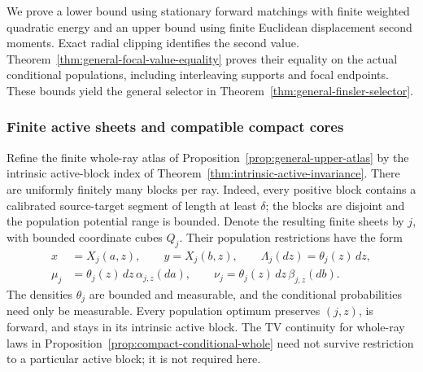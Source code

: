 \documentclass[11pt,reqno]{amsart}
\theoremstyle{definition}
\theoremstyle{remark}
\numberwithin{equation}{section}
\begin{document}
We prove a lower bound using stationary forward matchings with finite
weighted quadratic energy and an upper bound using finite Euclidean
displacement second moments. Exact radial clipping identifies the
second value. Theorem~\ref{thm:general-focal-value-equality} proves
their equality on the actual conditional populations, including
interleaving supports and focal endpoints. These bounds yield the
general selector in Theorem~\ref{thm:general-finsler-selector}.

\subsubsection{Finite active sheets and compatible compact cores}

Refine the finite whole-ray atlas of
Proposition~\ref{prop:general-upper-atlas} by the intrinsic active-block
index of Theorem~\ref{thm:intrinsic-active-invariance}. There are uniformly
finitely many blocks per ray. Indeed, every positive block contains a
calibrated source-target segment of length at least \(\delta\); the blocks
are disjoint and the population potential range is bounded. Denote the
resulting finite sheets by \(j\), with bounded coordinate cubes \(Q_j\).
Their population restrictions have the form
\begin{equation}
\label{general-gluing-sheet-disintegration}
 \begin{split}
 x&=X_j(a,z),\qquad y=X_j(b,z),\qquad
 \Lambda_j(dz)=\theta_j(z)\,dz,\\
 \mu_j&=\theta_j(z)\,dz\,\alpha_{j,z}(da),\qquad
 \nu_j=\theta_j(z)\,dz\,\beta_{j,z}(db).
 \end{split}
\end{equation}
The densities \(\theta_j\) are bounded and measurable, and the conditional
probabilities need only be measurable. Every population optimum preserves
\((j,z)\), is forward, and stays in its intrinsic active block. The TV
continuity for whole-ray laws in
Proposition~\ref{prop:compact-conditional-whole} need not survive restriction
to a particular active block; it is not required here.
\end{document}
